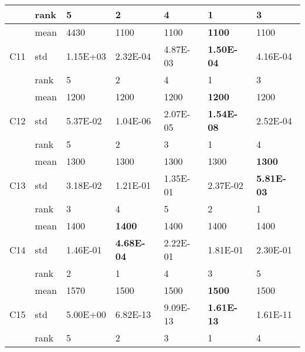 \begin{table}[]
\begin{tabular}{|l|l|l|l|l|l|l|}
                     & rank & 5        & 2                 & 4                 & 1                 & 3                 \\ \hline
\multirow{3}{*}{C11} & mean & 4430     & 1100              & 1100              & \textbf{1100}     & 1100              \\ \cline{2-7} 
                     & std  & 1.15E+03 & 2.32E-04          & 4.87E-03          & \textbf{1.50E-04} & 4.16E-04          \\ \cline{2-7} 
                     & rank & 5        & 2                 & 4                 & 1                 & 3                 \\ \hline
\multirow{3}{*}{C12} & mean & 1200     & 1200              & 1200              & \textbf{1200}     & 1200              \\ \cline{2-7} 
                     & std  & 5.37E-02 & 1.04E-06          & 2.07E-05          & \textbf{1.54E-08} & 2.52E-04          \\ \cline{2-7} 
                     & rank & 5        & 2                 & 3                 & 1                 & 4                 \\ \hline
\multirow{3}{*}{C13} & mean & 1300     & 1300              & 1300              & 1300              & \textbf{1300}     \\ \cline{2-7} 
                     & std  & 3.18E-02 & 1.21E-01          & 1.35E-01          & 2.37E-02          & \textbf{5.81E-03} \\ \cline{2-7} 
                     & rank & 3        & 4                 & 5                 & 2                 & 1                 \\ \hline
\multirow{3}{*}{C14} & mean & 1400     & \textbf{1400}     & 1400              & 1400              & 1400              \\ \cline{2-7} 
                     & std  & 1.46E-01 & \textbf{4.68E-04} & 2.22E-01          & 1.81E-01          & 2.30E-01          \\ \cline{2-7} 
                     & rank & 2        & 1                 & 4                 & 3                 & 5                 \\ \hline
\multirow{3}{*}{C15} & mean & 1570     & 1500              & 1500              & \textbf{1500}     & 1500              \\ \cline{2-7} 
                     & std  & 5.00E+00 & 6.82E-13          & 9.09E-13          & \textbf{1.61E-13} & 1.61E-11          \\ \cline{2-7} 
                     & rank & 5        & 2                 & 3                 & 1                 & 4                 \\ \hline

\end{tabular}
\end{table}
